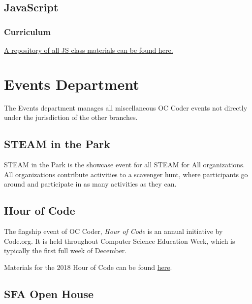 \documentclass[twoside,11pt,letterpaper,abstracton]{scrartcl}
\begin{document}
\subsection{JavaScript} \label{jcc-js}

\subsubsection{Curriculum}

\begin{resource}
    \href{https://drive.google.com/drive/folders/12zgeKhSd9gEaBEMIkI69AUVnp-plVbqc?usp=sharing}{A repository of all JS class materials can be found here.}
\end{resource}

\newpage

\section{Events Department} \label{events}

The Events department manages all miscellaneous OC Coder events not directly under the jurisdiction of the other branches. 

\subsection{STEAM in the Park} \label{events-sitp}

STEAM in the Park is the showcase event for all STEAM for All organizations. All organizations contribute activities to a scavenger hunt, where participants go around and participate in as many activities as they can.

\subsection{Hour of Code} \label{events-hoc}

The flagship event of OC Coder, \emph{Hour of Code} is an annual initiative by Code.org. It is held throughout Computer Science Education Week, which is typically the first full week of December.

\begin{resource}
    Materials for the 2018 Hour of Code can be found \href{https://drive.google.com/drive/folders/1VpVb9J50TpbheRf9bMmjayy6Iqel5Pwd?usp=sharing}{here}.
\end{resource}

\subsection{SFA Open House} \label{events-openhouse}
\end{document}
